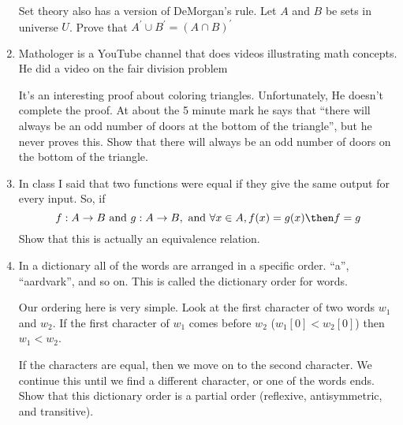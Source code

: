 \documentclass[basic, header]{nosvagor-notes}
\begin{document}
\begin{enumerate}[itemsep=5em]
      Set theory also has a version of DeMorgan's rule. Let $A$ and $B$ be sets
      in universe $U$. Prove that $A^{'} \cup B^{'} = (A \cap B)^{'}$

  \newpage %

    \item Mathologer is a YouTube channel that does videos illustrating math
      concepts. He did a video on the fair division problem
      \begin{center}
      \end{center}

      It's an interesting proof about coloring triangles. Unfortunately, He
      doesn't complete the proof. At about the 5 minute mark he says that
      ``there will always be an odd number of doors at the bottom of the
      triangle'',  but he never proves this. Show that there will always be an
      odd number of doors on the bottom of the triangle.

  \newpage %

    \item In class I said that two functions were equal if they give the same
      output for every input. So, if
      \[f : A \to B ~\text{and}~ g : A \to B, ~\text{and}~ \forall x\in A,
      f(x) = g(x)
      \then f= g
      \]
      Show that this is actually an equivalence relation.

  \newpage %

    \item In a dictionary all of the words are arranged in a specific order.
      ``a'', ``aardvark'', and so on.  This is called the dictionary order for
      words.

      Our ordering here is very simple.  Look at the first character of two
      words $w_1$ and $w_2$.  If the first character of $w_1$ comes before
      $w_2$ ($w_1[0] < w_2[0]$) then $w_1 < w_2$.

      If the characters are equal, then we move on to the second character. We
      continue this until we find a different character, or one of the words
      ends. Show that this dictionary order is a partial order (reflexive,
      antisymmetric, and transitive).

  \end{enumerate}
\end{document}
